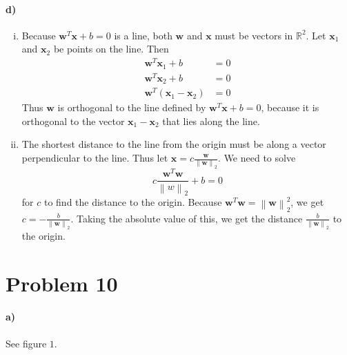 \documentclass[12pt]{article}
\begin{document}
\paragraph{d)}

\begin{enumerate}[i)]
        \item Because \(\mathbf{w}^T\mathbf{x}+b=0\) is a line, both \(\mathbf{w}\) and \(\mathbf{x}\) must be vectors in \(\mathbb{R}^2\). Let \(\mathbf{x}_1\) and
                \(\mathbf{x}_2\) be points on the line. Then
                \begin{align*}
                        \mathbf{w}^T\mathbf{x}_1+b&=0\\
                        \mathbf{w}^T\mathbf{x}_2+b&=0\\
                        \mathbf{w}^T\left(\mathbf{x}_1-\mathbf{x}_2\right)&=0
                \end{align*}
                Thus \(\mathbf{w}\) is orthogonal to the line defined by \(\mathbf{w}^T\mathbf{x}+b=0\), because it is orthogonal to the vector \(\mathbf{x}_1-\mathbf{x}_2\) that
                lies along the line.
        \item The shortest distance to the line from the origin must be along a vector perpendicular to the line. Thus let
                \(\mathbf{x}=c\frac{\mathbf{w}}{\left\lVert \mathbf{w}\right\rVert_2}\). We need to solve
                \[c\frac{\mathbf{w}^T\mathbf{w}}{\left\lVert w\right\rVert_2}+b=0\]
                for \(c\) to find the distance to the origin. Because
                \(\mathbf{w}^T\mathbf{w}=\left\lVert \mathbf{w}\right\rVert_2^2\), we get \(c=-\frac{b}{\left\lVert \mathbf{w}\right\rVert_2}\).
                Taking the absolute value of this, we get the distance \(\frac{b}{\left\lVert \mathbf{w}\right\rVert_2}\) to the origin.
\end{enumerate}

\section*{Problem 10}

\paragraph{a)} See figure \(1\).
\end{document}
